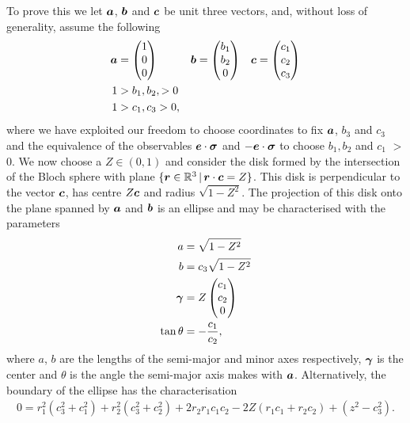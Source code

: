 To prove this we let $\bm{a}$, $\bm{b}$ and $\bm{c}$ be unit three vectors, and, without loss of generality, assume the following
\begin{align}
  \bm{a} &= \begin{pmatrix}1\\0\\0\end{pmatrix} &&
                                                \bm{b} = \begin{pmatrix}b_1\\b_2\\0\end{pmatrix} &&
  \bm{c} = \begin{pmatrix}c_1\\c_2\\c_3\end{pmatrix}\\
  1 &> b_1, b_2, > 0\\
  1 &> c_1, c_3 > 0,
\end{align}
where we have exploited our freedom to choose coordinates to fix $\bm{a}$, $b_3$ and $c_3$ and the equivalence of the observables $\bm{e}\cdot{\boldsymbol\sigma}$ and $-\bm{e}\cdot{\boldsymbol\sigma}$ to choose $b_1, b_2$ and $c_1$ $>$ 0. We now choose a $Z\in (0,1)$ and consider the disk formed by the intersection of the Bloch sphere with plane $\{\bm{r}\in\mathbb{R}^3\,|\,\bm{r}\cdot\bm{c} = Z\}$. This disk is perpendicular to the vector $\bm{c}$, has centre $Z \bm{c}$ and radius $\sqrt{1-Z^2}$. The projection of this disk onto the plane spanned by $\bm{a}$ and $\bm{b}$ is an ellipse and may be characterised with the parameters
\begin{align}
  a &= \sqrt{1-Z^2}\\
  b &= c_3\sqrt{1-Z^2}\\
  \bm{\gamma} &= Z \begin{pmatrix}c_1\\c_2\\0\end{pmatrix}\\
  \tan\theta &= -\frac{c_1}{c_2},
\end{align}
where $a$, $b$ are the lengths of the semi-major and minor axes respectively, $\bm{\gamma}$ is the center and $\theta$ is the angle the semi-major axis makes with $\bm{a}$. Alternatively, the boundary of the ellipse has the characterisation
\begin{align}
  \label{eqn:ellipse-quadratic}
  0 = r_1^2(c_3^2 + c_1^2) + r_2^2(c_3^2 + c_2^2) + 2 r_2 r_1 c_1 c_2 - 2 Z (r_1 c_1 + r_2 c_2) + (z^2 - c_3^2).
\end{align}
